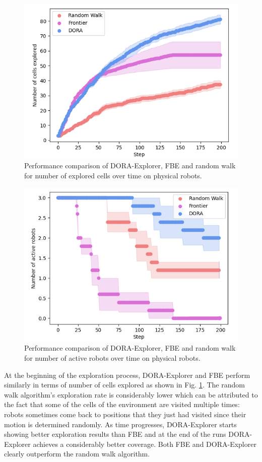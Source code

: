 \documentclass[letterpaper, 10 pt, conference]{ieeeconf}
\begin{document}
\begin{figure}[h]
    \centering
    \includegraphics[width=0.95\columnwidth]{images/explored_real.png}
    \caption{Performance comparison of DORA-Explorer, FBE and random walk for number of explored cells over time on physical robots.}
    \label{results:cells_explored_physical}
\end{figure}

\begin{figure}[h]
    \centering
    \includegraphics[width=0.95\columnwidth]{images/activerobots_real.png}
    \caption{Performance comparison of DORA-Explorer, FBE and random walk for number of active robots over time on physical robots.}
    \label{results:active_robots_physical}
\end{figure}

At the beginning of the exploration process, DORA-Explorer and FBE perform
similarly in terms of number of cells explored as shown in
Fig. \ref{results:cells_explored_physical}. The random walk
algorithm's exploration rate is considerably lower which can be
attributed to the fact that some of the cells of the environment are
visited multiple times: robots sometimes come back to positions that
they just had visited since their motion is determined randomly. As
time progresses, DORA-Explorer starts showing better exploration results than
FBE and at the end of the runs DORA-Explorer achieves a considerably better
coverage. Both FBE and DORA-Explorer clearly outperform the random walk
algorithm.
\end{document}
